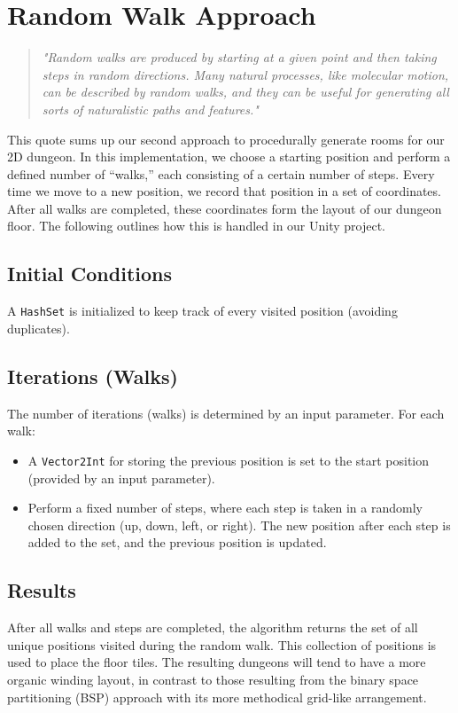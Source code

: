 \documentclass[a4paper, 12pt, one column, aas_macros]{article}
\begin{document}
\section{Random Walk Approach}
\begin{quote}
  \emph{"Random walks are produced by starting at a given point and then taking steps in random directions. Many natural processes, like molecular  motion, can be described by random walks, and they can be useful for  generating all sorts of naturalistic paths and features."}
  \cite[p.~286]{ShortAdams2017}
\end{quote}

This quote sums up our second approach to procedurally generate rooms for our 2D dungeon. In this implementation, we choose a starting position and perform a defined number of ``walks,'' each consisting of a certain number of steps. Every time we move to a new position, we record that position in a set of coordinates. After all walks are completed, these coordinates form the layout of our dungeon floor. The following outlines how this is handled in our Unity project.

\subsection{Initial Conditions}
A \texttt{HashSet} is initialized to keep track of every visited position (avoiding duplicates).

\subsection{Iterations (Walks)}
The number of iterations (walks) is determined by an input parameter. For each walk:
\begin{itemize}
  \item A \texttt{Vector2Int} for storing the previous position is set to the start position (provided by an input parameter).
  \item Perform a fixed number of steps, where each step is taken in a randomly chosen direction (up, down, left, or right). The new position after each step is added to the set, and the previous position is updated.  
\end{itemize}

\subsection{Results}
After all walks and steps are completed, the algorithm returns the set of all unique positions visited during the random walk. This collection of positions is used to place the floor tiles. The resulting dungeons will tend to have a more organic winding layout, in contrast to those resulting from the binary space partitioning (BSP) approach with its more methodical grid-like arrangement.


\end{document}

